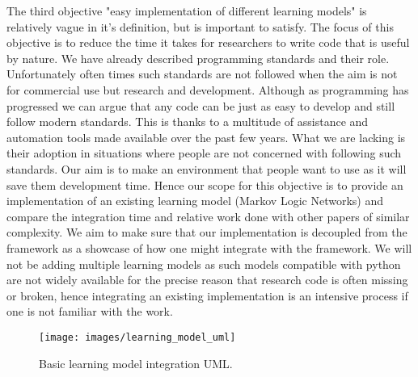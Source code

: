 The third objective "easy implementation of different learning models" is relatively vague in it's definition, but is important to satisfy. The focus of this objective is to reduce the time it takes for researchers to write code that is useful by nature. We have already described programming standards and their role. Unfortunately often times such standards are not followed when the aim is not for commercial use but research and development. Although as programming has progressed we can argue that any code can be just as easy to develop and still follow modern standards. This is thanks to a multitude of assistance and automation tools made available over the past few years. What we are lacking is their adoption in situations where people are not concerned with following such standards. Our aim is to make an environment that people want to use as it will save them development time. Hence our scope for this objective is to provide an implementation of an existing learning model (Markov Logic Networks) and compare the integration time and relative work done with other papers of similar complexity. We aim to make sure that our implementation is decoupled from the framework as a showcase of how one might integrate with the framework. We will not be adding multiple learning models as such models compatible with python are not widely available for the precise reason that research code is often missing or broken, hence integrating an existing implementation is an intensive process if one is not familiar with the work.
\begin{figure}[h]
\centering
 \texttt{[image: images/learning\_model\_uml]}
 \caption{Basic learning model integration UML.}
 \label{fig:learning-model-uml}
\end{figure}

